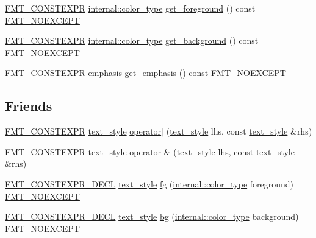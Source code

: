 \begin{DoxyCompactItemize}
\item 
\hyperlink{core_8h_a69201cb276383873487bf68b4ef8b4cd}{F\+M\+T\+\_\+\+C\+O\+N\+S\+T\+E\+X\+PR} \hyperlink{structinternal_1_1color__type}{internal\+::color\+\_\+type} \hyperlink{classtext__style_a695368429b582c3fef9b28e138beec4a}{get\+\_\+foreground} () const \hyperlink{core_8h_aef128913e8400683b1cbd1a3a2e11df3}{F\+M\+T\+\_\+\+N\+O\+E\+X\+C\+E\+PT}
\item 
\hyperlink{core_8h_a69201cb276383873487bf68b4ef8b4cd}{F\+M\+T\+\_\+\+C\+O\+N\+S\+T\+E\+X\+PR} \hyperlink{structinternal_1_1color__type}{internal\+::color\+\_\+type} \hyperlink{classtext__style_a00fb4a1cc65844bc819f71a80050181f}{get\+\_\+background} () const \hyperlink{core_8h_aef128913e8400683b1cbd1a3a2e11df3}{F\+M\+T\+\_\+\+N\+O\+E\+X\+C\+E\+PT}
\item 
\hyperlink{core_8h_a69201cb276383873487bf68b4ef8b4cd}{F\+M\+T\+\_\+\+C\+O\+N\+S\+T\+E\+X\+PR} \hyperlink{color_8h_a535b59b8edc8902bb3c4f254625f91ba}{emphasis} \hyperlink{classtext__style_aecbbaaf438871b55905c4beaea7318b5}{get\+\_\+emphasis} () const \hyperlink{core_8h_aef128913e8400683b1cbd1a3a2e11df3}{F\+M\+T\+\_\+\+N\+O\+E\+X\+C\+E\+PT}
\end{DoxyCompactItemize}
\subsection*{Friends}
\begin{DoxyCompactItemize}
\item 
\hyperlink{core_8h_a69201cb276383873487bf68b4ef8b4cd}{F\+M\+T\+\_\+\+C\+O\+N\+S\+T\+E\+X\+PR} \hyperlink{classtext__style}{text\+\_\+style} \hyperlink{classtext__style_a35023459e415ef79bccff971618bfc1f}{operator$\vert$} (\hyperlink{classtext__style}{text\+\_\+style} lhs, const \hyperlink{classtext__style}{text\+\_\+style} \&rhs)
\item 
\hyperlink{core_8h_a69201cb276383873487bf68b4ef8b4cd}{F\+M\+T\+\_\+\+C\+O\+N\+S\+T\+E\+X\+PR} \hyperlink{classtext__style}{text\+\_\+style} \hyperlink{classtext__style_ad91686b3587b1ed9a9066210ac5efa0d}{operator \&} (\hyperlink{classtext__style}{text\+\_\+style} lhs, const \hyperlink{classtext__style}{text\+\_\+style} \&rhs)
\item 
\hyperlink{core_8h_af4388801466a5994a363d6005616371a}{F\+M\+T\+\_\+\+C\+O\+N\+S\+T\+E\+X\+P\+R\+\_\+\+D\+E\+CL} \hyperlink{classtext__style}{text\+\_\+style} \hyperlink{classtext__style_aba4da2dafd6afe1360a856a03db2eddd}{fg} (\hyperlink{structinternal_1_1color__type}{internal\+::color\+\_\+type} foreground) \hyperlink{core_8h_aef128913e8400683b1cbd1a3a2e11df3}{F\+M\+T\+\_\+\+N\+O\+E\+X\+C\+E\+PT}
\item 
\hyperlink{core_8h_af4388801466a5994a363d6005616371a}{F\+M\+T\+\_\+\+C\+O\+N\+S\+T\+E\+X\+P\+R\+\_\+\+D\+E\+CL} \hyperlink{classtext__style}{text\+\_\+style} \hyperlink{classtext__style_a7eec86de8721ad96ef9b700d47f0d1e1}{bg} (\hyperlink{structinternal_1_1color__type}{internal\+::color\+\_\+type} background) \hyperlink{core_8h_aef128913e8400683b1cbd1a3a2e11df3}{F\+M\+T\+\_\+\+N\+O\+E\+X\+C\+E\+PT}
\end{DoxyCompactItemize}



